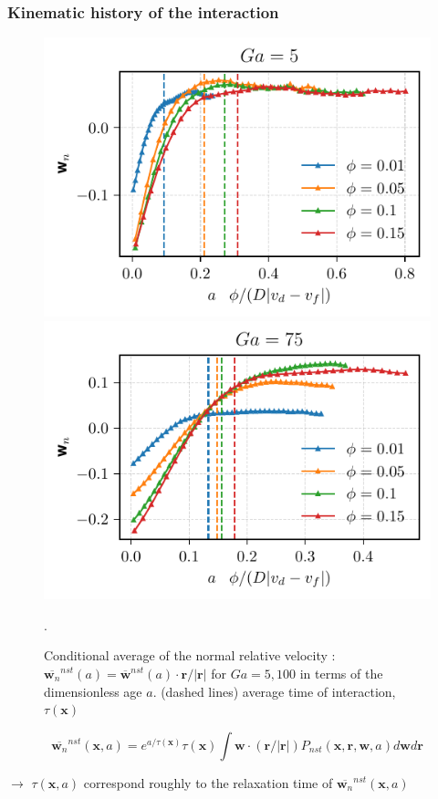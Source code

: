 \documentclass{sintefbeamer}
\newcommand{\nstavg}[1]{\overline{#1}^{nst}}
\begin{document}
\begin{frame}
  \frametitle{Kinematic history of the interaction}
    \begin{figure}
        \includegraphics[height=0.24\textwidth]{image/HOMOGENEOUS/fDrop/ur_a_Ga_5.pdf}
        \includegraphics[height=0.24\textwidth]{image/HOMOGENEOUS/fDrop/ur_a_Ga_75.pdf}
        \caption{Conditional average of the normal relative velocity : $\nstavg{\textbf{w}_n}(a) = \nstavg{\textbf{w}}(a)\cdot \textbf{r}/|\textbf{r}|$ for $Ga = 5,100$ in terms of the dimensionless age $a$.
        (dashed lines) average time of interaction, $\tau(\textbf{x})$}. 
    \end{figure}
  \begin{equation*}
     \nstavg{\textbf{w}_n}(\textbf{x},a)
    = e^{a/\tau(\textbf{x})}\tau(\textbf{x})\int \textbf{w}\cdot(\textbf{r}/|\textbf{r}|) P_{nst}(\textbf{x},\textbf{r},\textbf{w},a) d\textbf{w}d\textbf{r}
  \end{equation*}

$\rightarrow$ $\tau(\textbf{x},a)$ correspond roughly to the relaxation time of $\nstavg{\textbf{w}_n}(\textbf{x},a)$
\end{frame}
\end{document}
